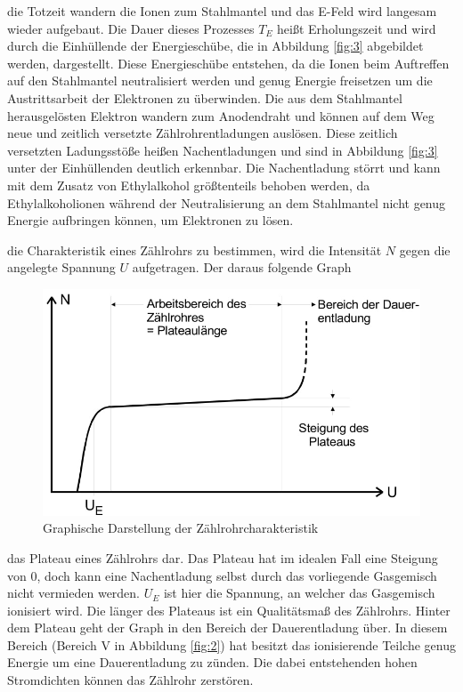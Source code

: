     \justifying die Totzeit wandern die Ionen zum Stahlmantel und das E-Feld wird
    langesam wieder aufgebaut. Die Dauer dieses Prozesses $T_E$ heißt Erholungszeit und wird durch
    die Einhüllende der Energieschübe, die in Abbildung \ref{fig:3} abgebildet werden, dargestellt.
    Diese Energieschübe entstehen, da die Ionen beim Auftreffen auf den Stahlmantel neutralisiert 
    werden und genug Energie freisetzen um die Austrittsarbeit der Elektronen zu überwinden. Die
    aus dem Stahlmantel herausgelösten Elektron wandern zum Anodendraht und können auf dem Weg 
    neue und zeitlich versetzte Zählrohrentladungen auslösen. Diese zeitlich versetzten Ladungsstöße
    heißen Nachentladungen und sind in Abbildung \ref{fig:3} unter der Einhüllenden deutlich erkennbar.
    Die Nachentladung störrt und kann mit dem Zusatz von Ethylalkohol größtenteils behoben werden, da 
    Ethylalkoholionen während der Neutralisierung an dem Stahlmantel nicht genug Energie aufbringen 
    können, um Elektronen zu lösen. 

    \newpage
    \justifying die Charakteristik eines Zählrohrs zu bestimmen, wird die Intensität
    $N$ gegen die angelegte Spannung $U$ aufgetragen. Der daraus folgende Graph

    \begin{figure}[H]
        \centering
        \includegraphics[width=\linewidth]{images/Plateau.jpg}
        \caption{Graphische Darstellung der Zählrohrcharakteristik \cite{V703}}
        \label{fig:4}
    \end{figure}

    \justifying das Plateau eines Zählrohrs dar. Das Plateau hat im idealen Fall
    eine Steigung von $0$, doch kann eine Nachentladung selbst durch das vorliegende Gasgemisch nicht
    vermieden werden. $U_E$ ist hier die Spannung, an welcher das Gasgemisch ionisiert wird. Die länger
    des Plateaus ist ein Qualitätsmaß des Zählrohrs. Hinter dem Plateau geht der Graph in den Bereich
    der Dauerentladung über. In diesem Bereich (Bereich V in Abbildung \ref{fig:2}) hat besitzt das 
    ionisierende Teilche genug Energie um eine Dauerentladung zu zünden. Die dabei entstehenden hohen 
    Stromdichten können das Zählrohr zerstören.

